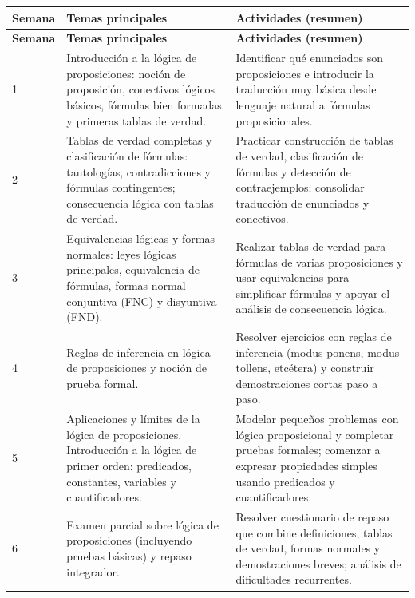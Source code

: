 \documentclass[12pt]{article}
\begin{document}
\setlength{\extrarowheight}{2pt}
\begin{longtable}{|>{\centering\arraybackslash}p{1.2cm}|p{7.2cm}|p{7.2cm}|}
	\hline
	\textbf{Semana} & \textbf{Temas principales} & \textbf{Actividades (resumen)} \\
	\hline
	\endfirsthead
	\hline
	\textbf{Semana} & \textbf{Temas principales} & \textbf{Actividades (resumen)} \\
	\hline
	\endhead
	
	1 & 
	Introducción a la lógica de proposiciones: noción de proposición, conectivos lógicos básicos, fórmulas bien formadas y primeras tablas de verdad. &
	Identificar qué enunciados son proposiciones e introducir la traducción muy básica desde lenguaje natural a fórmulas proposicionales. \\
	\hline
	
	2 &
	Tablas de verdad completas y clasificación de fórmulas: tautologías, contradicciones y fórmulas contingentes; consecuencia lógica con tablas de verdad. &
	Practicar construcción de tablas de verdad, clasificación de fórmulas y detección de contraejemplos; consolidar traducción de enunciados y conectivos. \\
	\hline
	
	3 &
	Equivalencias lógicas y formas normales: leyes lógicas principales, equivalencia de fórmulas, formas normal conjuntiva (FNC) y disyuntiva (FND). &
	Realizar tablas de verdad para fórmulas de varias proposiciones y usar equivalencias para simplificar fórmulas y apoyar el análisis de consecuencia lógica. \\
	\hline
	
	4 &
	Reglas de inferencia en lógica de proposiciones y noción de prueba formal. &
	Resolver ejercicios con reglas de inferencia (modus ponens, modus tollens, etcétera) y construir demostraciones cortas paso a paso. \\
	\hline
	
	5 &
	Aplicaciones y límites de la lógica de proposiciones. Introducción a la lógica de primer orden: predicados, constantes, variables y cuantificadores. &
	Modelar pequeños problemas con lógica proposicional y completar pruebas formales; comenzar a expresar propiedades simples usando predicados y cuantificadores. \\
	\hline
	
	6 &
	Examen parcial sobre lógica de proposiciones (incluyendo pruebas básicas) y repaso integrador. &
	Resolver cuestionario de repaso que combine definiciones, tablas de verdad, formas normales y demostraciones breves; análisis de dificultades recurrentes. \\
	\hline
	

\end{longtable}
\end{document}
